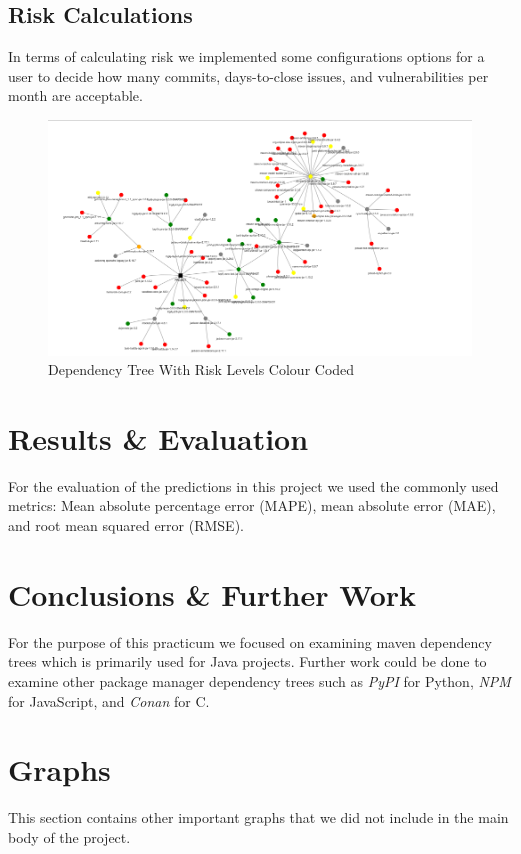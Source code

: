 \documentclass[10pt, onecolumn]{IEEEtran}
\begin{document}
\subsection{Risk Calculations}
In terms of calculating risk we implemented some configurations options for a user to decide how many commits, days-to-close issues, and vulnerabilities per month are acceptable. 
\begin{figure}
    \centering
    \includegraphics[width=01\linewidth]{image.png}
    \caption{Dependency Tree With Risk Levels Colour Coded}
\end{figure}

\section{Results \& Evaluation}
For the evaluation of the predictions in this project we used the commonly used metrics: Mean absolute percentage error (MAPE), mean absolute error (MAE), and root mean squared error (RMSE). 

\section{Conclusions \& Further Work}
For the purpose of this practicum we focused on examining maven dependency trees which is primarily used for Java projects. Further work could be done to examine other package manager dependency trees such as \textit{PyPI} for Python, \textit{NPM} for JavaScript, and \textit{Conan} for C. 


\appendices
\section{Graphs}
This section contains other important graphs that we did not include in the main body of the project.


\ifCLASSOPTIONcaptionsoff
  \newpage
\fi
\end{document}
